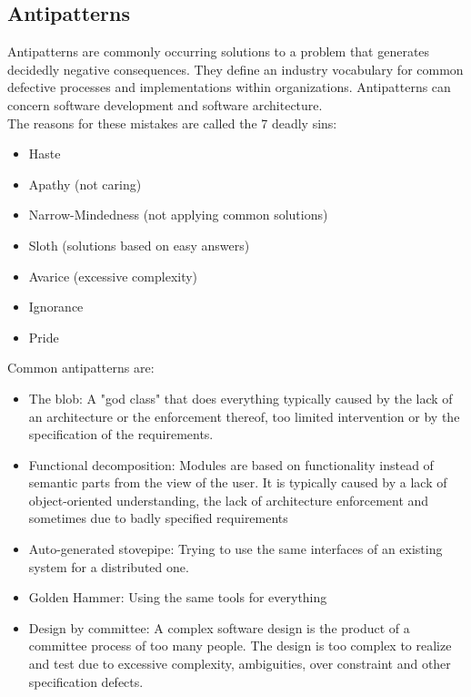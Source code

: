 \subsection{Antipatterns}
Antipatterns are commonly occurring solutions to a problem that generates decidedly negative consequences.
They define an industry vocabulary for common defective processes and implementations within organizations.
Antipatterns can concern software development and software architecture.\\
The reasons for these mistakes are called the 7 deadly sins:
\begin{itemize}
  \item Haste
  \item Apathy (not caring)
  \item Narrow-Mindedness (not applying common solutions)
  \item Sloth (solutions based on easy answers)
  \item Avarice (excessive complexity)
  \item Ignorance
  \item Pride
\end{itemize}

Common antipatterns are:
\begin{itemize}
  \item The blob: A "god class" that does everything typically caused by the lack of an architecture or the enforcement thereof, too limited intervention or by the specification of the requirements. 
  \item Functional decomposition: Modules are based on functionality instead of semantic parts from the view of the user. It is typically caused by a lack of object-oriented understanding, the lack of architecture enforcement and sometimes due to badly specified requirements
  \item Auto-generated stovepipe: Trying to use the same interfaces of an existing system for a distributed one.
  \item Golden Hammer: Using the same tools for everything
  \item Design by committee: A complex software design is the product of a committee process of too many people. The design is too complex to realize and test due to excessive complexity, ambiguities, over constraint and other specification defects.
\end{itemize}

